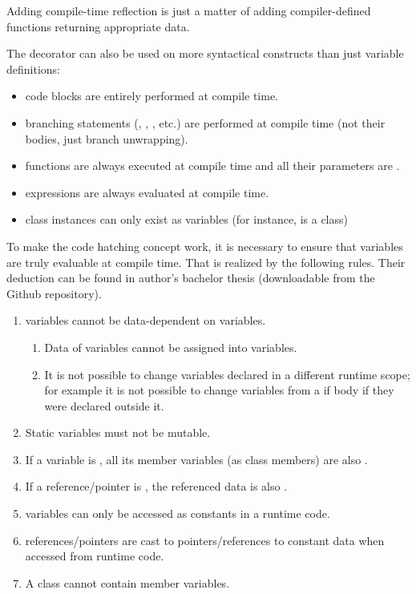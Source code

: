 \documentclass{ExcelAtFIT}
\begin{document}
Adding compile-time reflection is just a matter of adding compiler-defined functions returning appropriate \ctime data.

The  decorator can also be used on more syntactical constructs than just variable definitions:
\begin{itemize}
	\item \ctime code blocks are entirely performed at compile time.
	\item \ctime branching statements (, , , etc.) are performed at compile time (not their bodies, just branch unwrapping).
	\item \ctime functions are always executed at compile time and all their parameters are \ctime.
	\item \ctime expressions are always evaluated at compile time.
	\item \ctime class instances can only exist as \ctime variables (for instance,  is a \ctime class)
\end{itemize}

To make the code hatching concept work, it is necessary to ensure that \ctime variables are truly evaluable at compile time. That is realized by the following rules. Their deduction can be found in author's bachelor thesis \cite{MyThesis} (downloadable from the Github repository).
\begin{enumerate}
	\item \ctime variables cannot be data-dependent on \nonctime variables.
	\begin{enumerate}
		\item Data of \nonctime variables cannot be assigned into \ctime variables.
		\item It is not possible to change \ctime variables declared in a different runtime scope; for example it is not possible to change \ctime variables from a \nonctime if body if they were declared outside it.
	\end{enumerate}
	\item Static \ctime variables must not be mutable.
	\item If a variable is \ctime, all its member variables (as class members) are also \ctime.
	\item If a reference/pointer is \ctime, the referenced data is also \ctime.
	\item \ctime variables can only be accessed as constants in a runtime code.
	\item \ctime references/pointers are cast to pointers/references to constant data when accessed from runtime code.
	\item A \nonctime class cannot contain member \ctime variables.
\end{enumerate}
\end{document}
